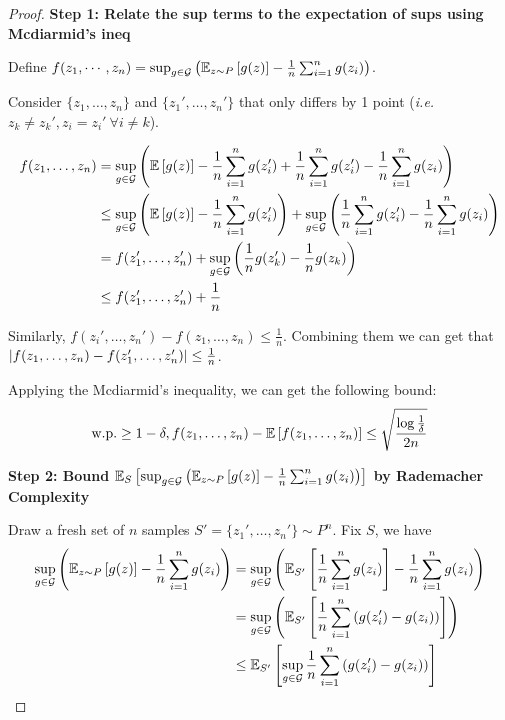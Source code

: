\begin{proof}
    \textbf{Step 1: Relate the sup terms to the expectation of sups using Mcdiarmid's ineq }

    Define \(f(z_1, \cdots, z_n) = \sup_{g \in \mathcal{G}} \left(\mathbb{E}_{z \sim P}\left[ g(z) \right] - \frac{1}{n}\sum_{i=1}^n g(z_i)
    \right)\). 

    Consider \(\{z_1, \ldots, z_n\}\) and \(\{z_1', \ldots, z_n'\}\) that only differs by 
    1 point (\emph{i.e.} \(z_k \neq z_k', z_i = z_i' \ \forall i \neq k\)). 

    \begin{align*}
        f(z_1, \ldots, z_n) &= \sup_{g \in \mathcal{G}} \left( \mathbb{E}\left[ g(z) \right] - 
        \frac{1}{n}\sum_{i=1}^n g(z_i') + \frac{1}{n}\sum_{i=1}^n g(z_i') - 
        \frac{1}{n} \sum_{i=1}^n g(z_i) \right) \\ 
        & \leq \sup_{g \in \mathcal{G}} \left( \mathbb{E}\left[ g(z) \right] - \frac{1}{n}\sum_{i=1}^n g(z_i') \right)
        + \sup_{g \in \mathcal{G}} \left(\frac{1}{n} \sum_{i=1}^n g(z_i') - \frac{1}{n} \sum_{i=1}^n g(z_i)\right) \\ 
        & = f(z_1', \ldots, z_n') + \sup_{g \in \mathcal{G}} \left(\frac{1}{n} g(z_k') - \frac{1}{n} g(z_k)\right) \\ 
        & \leq f(z_1', \ldots, z_n') + \frac{1}{n}
    \end{align*}

    Similarly, \(f(z_i', \ldots, z_n') - f(z_1, \ldots, z_n) \leq \frac{1}{n}\). 
    Combining them we can get that \(\lvert f(z_1, \ldots, z_n) - f(z_1', \ldots, z_n') \rvert \leq \frac{1}{n}\). 

    Applying the Mcdiarmid's inequality, we can get the following bound: 
    \[
      \text{w.p.} \geq 1 - \delta, f(z_1,\ldots, z_n) - \mathbb{E} \left[ f(z_1,\ldots, z_n) \right] \leq 
      \sqrt{\frac{\log \frac{1}{\delta}}{2n}}  
    \]

    \textbf{Step 2: Bound \(\mathbb{E}_S \left[ \sup_{g \in \mathcal{G}} \left(\mathbb{E}_{z\sim P}\left[ g(z) \right] - 
    \frac{1}{n}\sum_{i=1}^n g(z_i)\right) \right]\) by Rademacher Complexity}

    Draw a fresh set of \(n\) samples \(S' = \{z_1', \ldots, z_n'\} \sim P^n\). Fix \(S\), we have 
    \begin{align*}
        \sup_{g \in \mathcal{G}}  \left( \mathbb{E}_{z \sim P} \left[ g(z) \right] - \frac{1}{n} \sum_{i=1}^n g(z_i)\right)
        &= \sup_{g \in \mathcal{G}} \left( \mathbb{E}_{S'} \left[ \frac{1}{n}\sum_{i=1}^n g(z_i) \right] - \frac{1}{n}\sum_{i=1}^n g(z_i)  \right) \\ 
        &= \sup_{g \in \mathcal{G}} \left( \mathbb{E}_{S'} \left[ \frac{1}{n} \sum_{i=1}^n \left(g(z_i') - g(z_i)\right)  \right]  \right) \\
        &\leq \mathbb{E}_{S'} \left[ \sup_{g\in \mathcal{G}} \frac{1}{n} \sum_{i=1}^n \left(g(z_i') - g(z_i)\right) \right] 
    \end{align*}


\end{proof}
